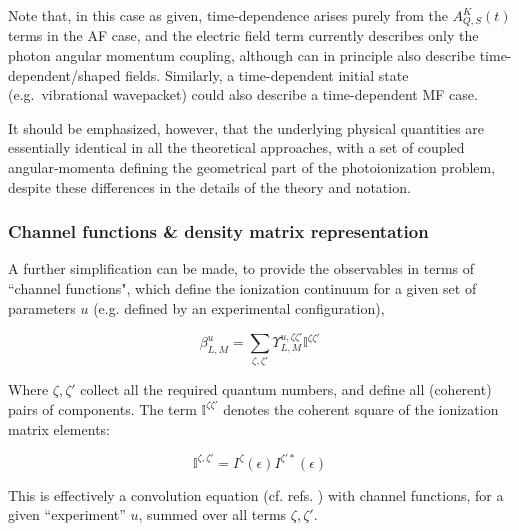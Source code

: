 Note that, in this case as given, time-dependence arises purely from the \(A_{Q,S}^{K}(t)\) terms in the AF case, and the electric field term currently describes only the photon angular momentum coupling,
although can in principle also describe time-dependent/shaped fields. Similarly, a time-dependent initial state (e.g.~vibrational wavepacket) could also describe a time-dependent MF case.

It should be emphasized, however, that the underlying physical quantities are essentially identical in all the theoretical approaches, with a set of coupled angular-momenta defining the geometrical part of the photoionization problem, despite these differences in the details of the theory and notation. 


\subsubsection{Channel functions \& density matrix representation}

A further simplification can be made, to provide the observables in terms of ``channel functions", which define the ionization continuum for a given set of parameters $u$ (e.g. defined by an experimental configuration),

\begin{equation}
\beta_{L,M}^{u}=\sum_{\zeta,\zeta'}\varUpsilon_{L,M}^{u,\zeta\zeta'}\mathbb{I}^{\zeta\zeta'}\label{eqn:channel-fns}
\end{equation}


Where $\zeta,\zeta'$ collect all the required quantum numbers, and define all (coherent) pairs of components. The term $\mathbb{I}^{\zeta\zeta'}$ denotes the coherent square of the ionization matrix elements:

\begin{equation}
\mathbb{I}^{\zeta,\zeta'}=I^{\zeta}(\epsilon)I^{\zeta'*}(\epsilon)
\end{equation}

This is effectively a convolution equation (cf. refs. \cite{Reid2000,gregory2021MolecularFramePhotoelectron}) with channel functions, for a given ``experiment'' $u$, summed over all terms $\zeta,\zeta'$.


